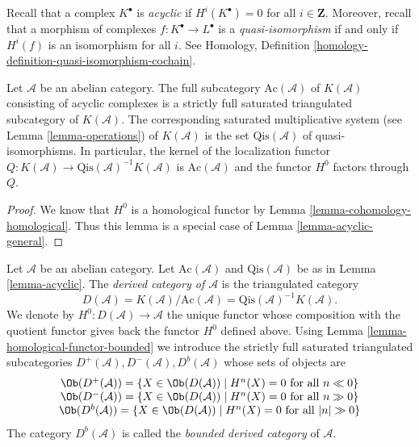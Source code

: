 \medskip\noindent
Recall that a complex $K^\bullet$ is {\it acyclic} if $H^i(K^\bullet) = 0$
for all $i \in \mathbf{Z}$. Moreover, recall that a morphism of complexes
$f : K^\bullet \to L^\bullet$ is a {\it quasi-isomorphism} if and only if
$H^i(f)$ is an isomorphism for all $i$. See
Homology, Definition \ref{homology-definition-quasi-isomorphism-cochain}.

\begin{lemma}
\label{lemma-acyclic}
Let $\mathcal{A}$ be an abelian category. The full subcategory
$\text{Ac}(\mathcal{A})$ of $K(\mathcal{A})$ consisting of acyclic complexes
is a strictly full saturated triangulated subcategory of $K(\mathcal{A})$.
The corresponding saturated multiplicative system (see
Lemma \ref{lemma-operations})
of $K(\mathcal{A})$ is the set $\text{Qis}(\mathcal{A})$
of quasi-isomorphisms. In particular, the kernel of the localization
functor $Q : K(\mathcal{A}) \to \text{Qis}(\mathcal{A})^{-1}K(\mathcal{A})$
is $\text{Ac}(\mathcal{A})$ and the functor $H^0$ factors through $Q$.
\end{lemma}

\begin{proof}
We know that $H^0$ is a homological functor by
Lemma \ref{lemma-cohomology-homological}.
Thus this lemma is a special case of
Lemma \ref{lemma-acyclic-general}.
\end{proof}

\begin{definition}
\label{definition-unbounded-derived-category}
Let $\mathcal{A}$ be an abelian category.
Let $\text{Ac}(\mathcal{A})$ and $\text{Qis}(\mathcal{A})$
be as in
Lemma \ref{lemma-acyclic}.
The {\it derived category of $\mathcal{A}$} is the triangulated
category
$$
D(\mathcal{A}) =
K(\mathcal{A})/\text{Ac}(\mathcal{A}) =
\text{Qis}(\mathcal{A})^{-1} K(\mathcal{A}).
$$
We denote by $H^0 : D(\mathcal{A}) \to \mathcal{A}$ the unique functor
whose composition with the quotient functor gives back the functor
$H^0$ defined above. Using
Lemma \ref{lemma-homological-functor-bounded}
we introduce the strictly full saturated triangulated subcategories
$D^{+}(\mathcal{A}), D^{-}(\mathcal{A}), D^b(\mathcal{A})$
whose sets of objects are
$$
\begin{matrix}
\Ob(D^{+}(\mathcal{A})) =
\{X \in \Ob(D(\mathcal{A})) \mid
H^n(X) = 0\text{ for all }n \ll 0\} \\
\Ob(D^{-}(\mathcal{A})) =
\{X \in \Ob(D(\mathcal{A})) \mid
H^n(X) = 0\text{ for all }n \gg 0\} \\
\Ob(D^b(\mathcal{A})) =
\{X \in \Ob(D(\mathcal{A})) \mid
H^n(X) = 0\text{ for all }|n| \gg 0\}
\end{matrix}
$$
The category $D^b(\mathcal{A})$ is called the {\it bounded derived
category} of $\mathcal{A}$.
\end{definition}

